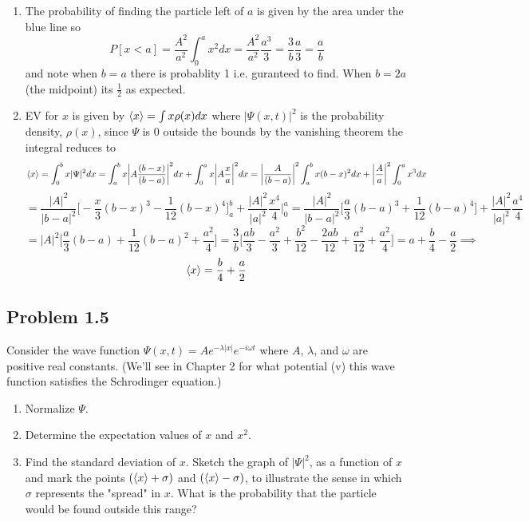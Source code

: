 \documentclass[12pt]{exam}
\begin{document}
\begin{solution}
\begin{enumerate}
        \item The probability of finding the particle left of $a$ is given by the area under the blue line so 
        $$P[x<a] = \frac{A^2}{a^2}\int^a_0 x^2dx =  \frac{A^2}{a^2}\frac{a^3}{3}  = \frac{3}{b}\frac{a}{3}=\frac{a}{b}$$ and note when $b=a$ there is probablity 1 i.e. guranteed to find. When $b=2a$ (the midpoint) its $\frac{1}{2}$ as expected.

        \item EV for $x$ is given by $\expval{x} = \int x \rho(x)dx$ where $|\Psi(x,t)|^2$ is the probability density, $\rho(x)$, since $\Psi$ is 0 outside the bounds by the vanishing theorem the integral reduces to   
        $$\expval{x} = \int^b_0 x|\Psi|^2dx = \int^b_a x\bigg|A\frac{(b-x)}{(b-a)}\bigg|^2dx + \int^a_0 x\bigg|A\frac{x}{a}\bigg|^2dx = \bigg|\frac{A}{(b-a)}\bigg|^2\int^b_a x(b-x)^2dx + \bigg|\frac{A}{a}\bigg|^2\int^a_0 x^3 dx$$
        $$=\frac{|A|^2}{|b-a|^2}\bigg[-\frac{x}{3}(b-x)^3 -\frac{1}{12}(b-x)^4\bigg]^b_a + \frac{|A|^2}{|a|^2}\frac{x^4}{4}\bigg|^a_0 = \frac{|A|^2}{|b-a|^2}\bigg[\frac{a}{3}(b-a)^3 +\frac{1}{12}(b-a)^4\bigg] + \frac{|A|^2}{|a|^2}\frac{a^4}{4}$$
        $$=|A|^2 \bigg[\frac{a}{3}(b-a) +\frac{1}{12}(b-a)^2 + \frac{a^2}{4}\bigg] = \frac{3}{b} \bigg[\frac{ab}{3}-\frac{a^2}{3} +\frac{b^2}{12}-\frac{2ab}{12} +\frac{a^2}{12} + \frac{a^2}{4}\bigg] = a + \frac{b}{4}-\frac{a}{2} \implies$$
        $$\expval{x} = \frac{b}{4}+\frac{a}{2}$$
    \end{enumerate}
\end{solution}




\subsection*{Problem 1.5}
Consider the wave function $\Psi(x,t) = Ae^{-\lambda|x|}e^{-i\omega t}$ where $A$, $\lambda$, and $\omega$ are positive real constants. (We'll see in Chapter 2 for what potential (v) this wave function satisfies the Schrodinger equation.)
\begin{enumerate}
    \item Normalize $\Psi$.
    \item Determine the expectation values of $x$ and $x^2$.
    \item Find the standard deviation of $x$. Sketch the graph of $|\Psi|^2$, as a function of $x$ and mark the points $(\expval{x}+\sigma)$ and $(\expval{x}-\sigma)$, to illustrate the sense in which $\sigma$ represents the "spread" in $x$. What is the probability that the particle would be found outside this range?
\end{enumerate}
\end{document}
